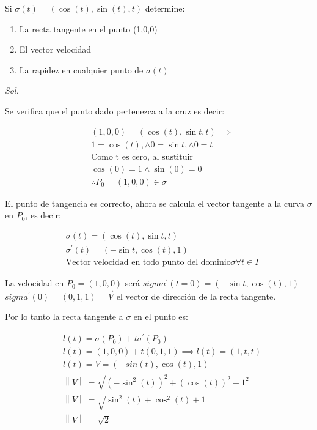 \begin{problem}
Si $\sigma(t)=\left(\cos{(t)},\sin{(t)},t\right)$ determine:
\begin{enumerate}
	\item La recta tangente en el punto (1,0,0)
	\item El vector velocidad
	\item La rapidez en cualquier punto de $\sigma(t)$
\end{enumerate}
\end{problem}

\textit{ Sol. }

Se verifica que el punto dado pertenezca a la cruz es decir:

\begin{align*}
	 & (1,0,0)=\left(\cos{(t)},\sin{t},t\right)\implies \\
	 & 1=\cos{(t)},\land 0=\sin{t},\land 0=t            \\
	 & \text{Como t es cero, al sustituir}              \\
	 & \cos{(0)}=1\land \sin{(0)}=0                     \\
	 & \therefore P_0=(1,0,0)\in\sigma
\end{align*}

El punto de tangencia es correcto, ahora se calcula el vector tangente a la curva
$\sigma$ en $P_0$, es decir:

\begin{align*}
	 & \sigma(t)=\left(\cos{(t)},\sin{t},t\right)                              \\
	 & \sigma^{\prime}(t)=\left(-\sin{t},\cos{(t)},1\right)=                   \\
	 & \text{Vector velocidad en todo punto del dominio} \sigma \forall t\in I
\end{align*}

La velocidad en $P_0=(1,0,0)$ será
$sigma^{\prime}(t=0)=\left(-\sin{t},\cos{(t)},1\right)$
$sigma^{\prime}(0)=(0,1,1)=\overrightarrow{V}$ el vector de dirección de la recta tangente.

Por lo tanto la recta tangente a $\sigma$ en el punto es:

\begin{align*}
	 & l(t)=\sigma(P_0)+ t\sigma^{\prime}(P_0)                                                   \\
	 & l(t)=(1,0,0)+t(0,1,1)\implies l(t)=(1,t,t)                                                \\
	 & l(t)=V=\left(-sin{(t)},\cos(t),1\right)                                                   \\
	 & \left\lVert V\right\rVert=\sqrt{\left(-\sin^2{(t)}\right)^2+\left(\cos{(t)}\right)^2+1^2} \\
	 & \left\lVert V\right\rVert=\sqrt{\sin^2{(t)}+\cos^2{(t)} +1}                               \\
	 & \left\lVert V\right\rVert=\sqrt{2}
\end{align*}

